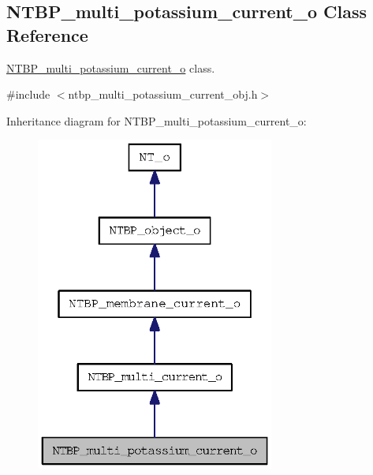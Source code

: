 \subsection{NTBP\_\-multi\_\-potassium\_\-current\_\-o Class Reference}
\label{class_n_t_b_p__multi__potassium__current__o}


\hyperlink{class_n_t_b_p__multi__potassium__current__o}{NTBP\_\-multi\_\-potassium\_\-current\_\-o} class.  




{\ttfamily \#include $<$ntbp\_\-multi\_\-potassium\_\-current\_\-obj.h$>$}



Inheritance diagram for NTBP\_\-multi\_\-potassium\_\-current\_\-o:
\nopagebreak
\begin{figure}[H]
\begin{center}
\leavevmode
\includegraphics[width=222pt]{class_n_t_b_p__multi__potassium__current__o__inherit__graph}
\end{center}
\end{figure}


